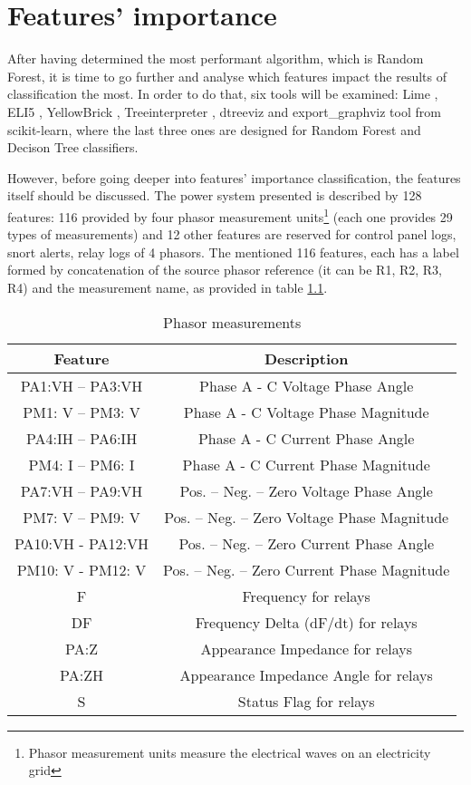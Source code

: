 \chapter{Features' importance}

After having determined the most performant algorithm, which is Random Forest, it is time to go further and analyse which features impact the results of classification the most. In order to do that, six tools will be examined: Lime \cite{lime}, ELI5 \cite{mikhail_korobov_eli5_nodate}, YellowBrick \cite{bengfort_yellowbrick_2018}, Treeinterpreter \cite{ando_saabas_treeinterpreter_nodate}, dtreeviz \cite{terence_parr_dtreeviz_nodate} and export\_graphviz tool from scikit-learn, where the last three ones are designed for Random Forest and Decison Tree classifiers.

However, before going deeper into features' importance classification, the features itself should be discussed. The power system presented \cite{adhikari_power_2014} is described by 128 features: 116 provided by four phasor measurement units\footnote{Phasor measurement units measure the electrical waves on an electricity grid} (each one provides 29 types of measurements) and 12 other features are reserved for control panel logs, snort alerts, relay logs of 4 phasors. The mentioned 116 features, each has a label formed by concatenation of the source phasor reference (it can be R1, R2, R3, R4) and the measurement name, as provided in table \ref{tab:pmu_mes}.

\begin{table}[H]
    \centering
    \caption[Phasor measurements]{Phasor measurements \cite{adhikari_power_2014}} \label{tab:pmu_mes}
    \begin{tabular}{|c|c|}\hline
        \textbf{Feature}&\textbf{Description} \\\hline
        PA1:VH – PA3:VH&Phase A - C Voltage Phase Angle \\\hline
        PM1: V – PM3: V&Phase A - C Voltage Phase Magnitude \\\hline
        PA4:IH – PA6:IH&Phase A - C Current Phase Angle \\\hline
        PM4: I – PM6: I&Phase A - C Current Phase Magnitude \\\hline
        PA7:VH – PA9:VH&Pos. – Neg. – Zero Voltage Phase Angle \\\hline
        PM7: V – PM9: V&Pos. – Neg. – Zero Voltage Phase Magnitude \\\hline
        PA10:VH - PA12:VH&Pos. – Neg. – Zero Current Phase Angle \\\hline
        PM10: V - PM12: V&Pos. – Neg. – Zero Current Phase Magnitude \\\hline
        F&Frequency for relays \\\hline
        DF&Frequency Delta (dF/dt) for relays \\\hline
        PA:Z&Appearance Impedance for relays \\\hline
        PA:ZH&Appearance Impedance Angle for relays \\\hline
        S&Status Flag for relays \\\hline
    \end{tabular}
\end{table}

